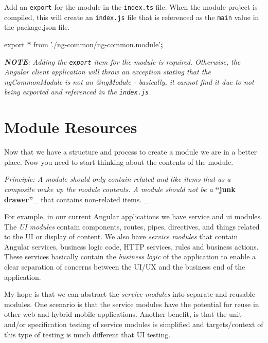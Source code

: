 \documentclass[]{book}
\newenvironment{Shaded}{\begin{snugshade}}{\end{snugshade}}
\newcommand{\StringTok}[1]{\textcolor[rgb]{0.31,0.60,0.02}{#1}}
\newcommand{\ImportTok}[1]{#1}
\newcommand{\OperatorTok}[1]{\textcolor[rgb]{0.81,0.36,0.00}{\textbf{#1}}}
\theoremstyle{definition}
\theoremstyle{definition}
\theoremstyle{definition}
\theoremstyle{remark}
\begin{document}
Add an \texttt{export} for the module in the \texttt{index.ts} file.
When the module project is compiled, this will create an
\texttt{index.js} file that is referenced as the \texttt{main} value in
the package.json file.

\begin{Shaded}
\begin{Highlighting}[]
\ImportTok{export} \OperatorTok{*} \ImportTok{from} \StringTok{'./ng-common/ng-common.module'}\OperatorTok{;}
\end{Highlighting}
\end{Shaded}

\emph{\textbf{NOTE}: Adding the \texttt{export} item for the module is
required. Otherwise, the Angular client application will throw an
exception stating that the ngCommonModule is not an @ngModule -
basically, it cannot find it due to not being exported and referenced in
the \texttt{index.js}.}

\section{Module Resources}\label{module-resources}

Now that we have a structure and process to create a module we are in a
better place. Now you need to start thinking about the contents of the
module.

\emph{Principle: A module should only contain related and like items
that as a composite make up the module contents. A module should not be
a }\textbf{``junk drawer''}\_ that contains non-related items. \_

For example, in our current Angular applications we have service and ui
modules. The \emph{UI modules} contain components, routes, pipes,
directives, and things related to the UI or display of content. We also
have \emph{service modules} that contain Angular services, business
logic code, HTTP services, rules and business actions. These services
basically contain the \emph{business logic} of the application to enable
a clear separation of concerns between the UI/UX and the business end of
the application.

My hope is that we can abstract the \emph{service modules} into separate
and reusable modules. One scenario is that the service modules have the
potential for reuse in other web and hybrid mobile applications. Another
benefit, is that the unit and/or specification testing of service
modules is simplified and targets/context of this type of testing is
much different that UI testing.
\end{document}
